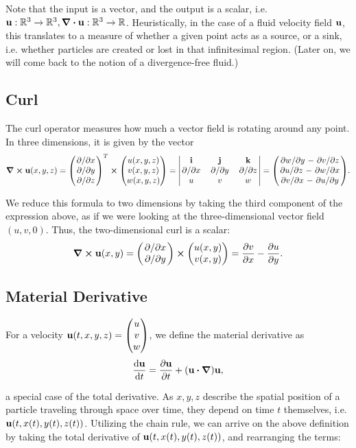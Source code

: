 Note that the input is a vector, and the output is a scalar, i.e. $\vb{u}:
\mathbb{R}^3 \to \mathbb{R}^3, \div{\vb{u}}: \mathbb{R}^3\to\mathbb{R}$.
Heuristically, in the case of a fluid velocity field $\vb{u}$, this translates
to a measure of whether a given point acts as a source, or a sink, i.e. whether
particles are created or lost in that infinitesimal region. (Later on, we will
come back to the notion of a divergence-free fluid.)

\subsection*{Curl}
The curl operator measures how much a vector field is rotating around any point. 
In three dimensions, it is given by the vector
$$\curl{\vb{u}(x,y,z) = 
    \mqty(\pdv*{x} \\ \pdv*{y} \\  \pdv*{z})^T \cross 
    \mqty(u(x,y,z) \\ v(x,y,z) \\ w(x,y,z))
= \mqty|
    \vb{i}   & \vb{j}   & \vb{k}   \\
    \pdv*{x} & \pdv*{y} & \pdv*{z} \\
    u        & v        & w
|} = \mqty(
\pdv*{w}{y} - \pdv*{v}{z} \\
\pdv*{u}{z} - \pdv*{w}{x} \\
\pdv*{v}{x} - \pdv*{u}{y}
).$$

We reduce this formula to two dimensions by taking the third component of
the expression above, as if we were looking at the three-dimensional vector
field $(u,v,0)$. Thus, the two-dimensional curl is a scalar:
$$\curl{\vb{u}(x,y)} = 
    \mqty(\pdv*{x} \\ \pdv*{y}) \cross 
    \mqty(u(x,y) \\ v(x,y))
    = \pdv{v}{x} - \pdv{u}{y}.$$

\subsection*{Material Derivative}
For a velocity $\vb{u}(t,x,y,z) = \mqty(u \\ v \\ w)$, 
we define the material derivative as 
$$\dv{\vb{u}}{t} = \pdv{\vb{u}}{t} + \qty(\vb{u}\vdot\grad)\vb{u} ,$$

a special case of the total derivative. As $x, y, z$ describe the spatial
position of a particle traveling through space over time, they depend on time
$t$ themselves, i.e. $\vb{u}(t, x(t), y(t), z(t))$. Utilizing the chain rule,
we can arrive on the above definition by taking the total derivative of
$\vb{u}(t, x(t), y(t), z(t))$, and rearranging the terms:

